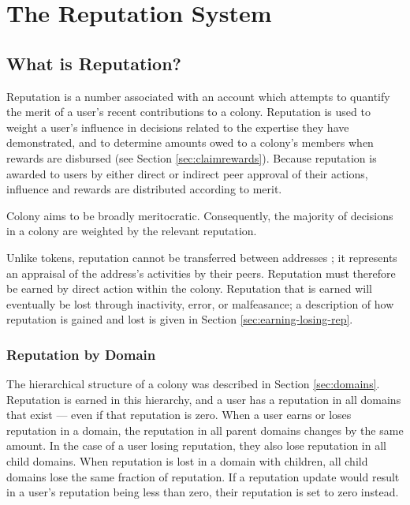 \section{The Reputation System}\label{sec:reputation}
\subsection{What is Reputation?}\label{subsec:what-is-reputation}

Reputation is a number associated with an account which attempts to quantify the merit of a user's recent contributions to a colony. Reputation is used to weight a user's influence in decisions related to the expertise they have demonstrated, and to determine amounts owed to a colony's members when rewards are disbursed (see Section \ref{sec:claimrewards}). Because reputation is awarded to users by either direct or indirect peer approval of their actions, influence and rewards are distributed according to merit.

Colony aims to be broadly meritocratic. Consequently, the majority of decisions in a colony are weighted by the relevant reputation.

Unlike tokens, reputation cannot be transferred between addresses %
; it represents an appraisal of the address's activities by their peers. Reputation must therefore be earned by direct action within the colony. Reputation that is earned will eventually be lost through inactivity, error, or malfeasance; a description of how reputation is gained and lost is given in Section \ref{sec:earning-losing-rep}.

\subsubsection{Reputation by Domain}\label{sec:rep-by-domain}
The hierarchical structure of a colony was described in Section \ref{sec:domains}. Reputation is earned in this hierarchy, and a user has a reputation in all domains that exist --- even if that reputation is zero. When a user earns or loses reputation in a domain, the reputation in all parent domains changes by the same amount. In the case of a user losing reputation, they also lose reputation in all child domains. When reputation is lost in a domain with children, all child domains lose the same fraction of reputation. If a reputation update would result in a user's reputation being less than zero, their reputation is set to zero instead.

